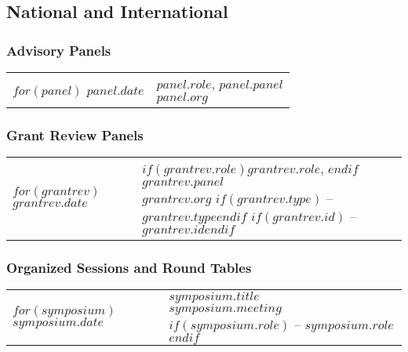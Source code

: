 \documentclass[martgin, line]{article}
\begin{document}


\subsection*{National and International}

\subsubsection*{Advisory Panels}
\setlength{\extrarowheight}{.75em}
\begin{tabular}{lp{5.5in}}   
$for(panel)$
$panel.date$&
\parbox[t]{5.5in}{$panel.role$, $panel.panel$\\
  \textit{$panel.org$}}\\
$endfor$
\end{tabular}
\setlength{\extrarowheight}{0em}

\subsubsection*{Grant Review Panels}
\setlength{\extrarowheight}{.75em}
\begin{tabular}{lp{5.5in}}   
$for(grantrev)$
$grantrev.date$&
\parbox[t]{5.5in}{
  $if(grantrev.role)$$grantrev.role$, $endif$ 
  $grantrev.panel$\\
  \textit{$grantrev.org$}
  $if(grantrev.type)$ -- \textit{$grantrev.type$}$endif$
  $if(grantrev.id)$ -- \textit{$grantrev.id$}$endif$
  }\\
$endfor$
\end{tabular}
\setlength{\extrarowheight}{0em}


\subsubsection*{Organized Sessions and Round Tables}
\setlength{\extrarowheight}{.75em}
\begin{tabular}{lp{5.5in}}   
$for(symposium)$
$symposium.date$&
\parbox[t]{5.5in}{
    $symposium.title$\\
  \textit{$symposium.meeting$}
  $if(symposium.role)$ -- $symposium.role$$endif$ 
  }\\
$endfor$
\end{tabular}
\setlength{\extrarowheight}{0em}
\end{document}
